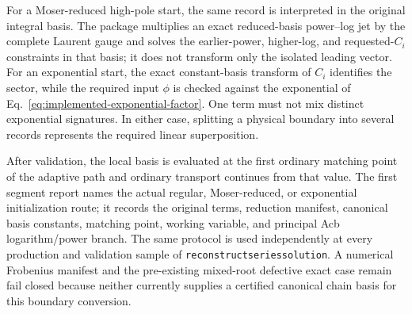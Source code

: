 \documentclass[11pt]{article}
\renewcommand{\_}{\origunderscore\allowbreak}
\begin{document}
For a Moser-reduced high-pole start, the same record is interpreted in the original integral
basis.  The package multiplies an exact reduced-basis power--log jet by the complete Laurent
gauge and solves the earlier-power, higher-log, and requested-$C_i$ constraints in that basis;
it does not transform only the isolated leading vector.  For an exponential start, the exact
constant-basis transform of $C_i$ identifies the sector, while the required input $\phi$ is
checked against the exponential of Eq.~\eqref{eq:implemented-exponential-factor}.  One term
must not mix distinct
exponential signatures.  In either case, splitting a physical boundary into several records
represents the required linear superposition.

After validation, the local basis is evaluated at the first ordinary matching point of the
adaptive path and ordinary transport continues from that value.  The first segment report
names the actual regular, Moser-reduced, or exponential initialization route; it records the
original terms, reduction manifest, canonical basis constants, matching point, working
variable, and principal Acb
logarithm/power branch.  The same protocol is used independently at every production
and validation sample of \texttt{reconstruct\_series\_solution}.  A numerical Frobenius
manifest and the pre-existing mixed-root defective exact case remain fail closed because
neither currently supplies a certified canonical chain basis for this boundary conversion.
\end{document}

